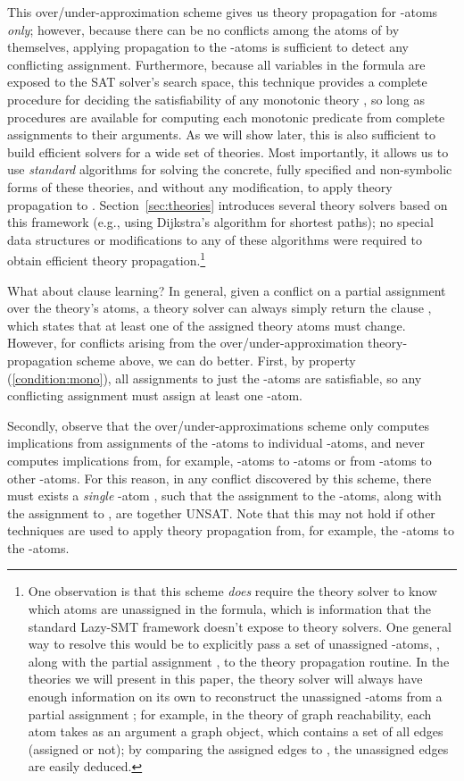 \documentclass[runningheads]{llncs}
\begin{document}
This over/under-approximation scheme gives us theory propagation for -atoms \textit{only};
however, because there can be no conflicts among the atoms of  by themselves, applying propagation to the -atoms is 
sufficient to detect any conflicting assignment. Furthermore, because all variables in the formula are exposed to the SAT solver's search space,
this technique provides a complete procedure for deciding the satisfiability of any monotonic theory ,
so long as procedures are available for computing each monotonic predicate from complete assignments to their arguments.
As we will show later,
this is also sufficient to build efficient solvers for a wide set of
theories. Most importantly, it allows us to use \textit{standard}
algorithms for solving the concrete, fully specified and non-symbolic
forms of these theories, and without any modification, to apply theory propagation to .
Section~\ref{sec:theories}
introduces several theory solvers based on this framework
(e.g., using Dijkstra's algorithm for shortest paths);
no special data structures or modifications to any of these
algorithms were required to obtain efficient theory propagation.\footnote{One observation is that this scheme \textit{does} require the theory solver
to know which atoms are unassigned in the formula, which is information that the
standard Lazy-SMT framework doesn't expose to theory solvers. 
One general way to resolve this would be to explicitly pass a set of unassigned
-atoms, , along with the partial assignment , to the theory
propagation routine. In the theories we will present in this
paper, the theory solver will always have enough information on its own to reconstruct
the unassigned -atoms from a partial assignment ; for example, in the 
theory of graph reachability, each  atom takes as an argument a 
graph object, which contains a set  of all edges (assigned or not); 
by comparing the assigned edges to , the unassigned edges are easily deduced.}

What about clause learning? In general, given a conflict on
a partial assignment  over the theory's atoms, a theory solver
can always simply return the clause , which states that at
least one of the assigned theory atoms must change. However,
for conflicts arising from the over/under-approximation
theory-propagation scheme above, we can do better. First, by property (\ref{condition:mono}),
all assignments to just the -atoms are satisfiable, so any conflicting
assignment must assign at least one -atom.

Secondly, observe that the over/under-approximations scheme only computes implications
from assignments of the -atoms  to individual -atoms, and never computes
implications from, for example, -atoms to -atoms or from -atoms to other -atoms.
For this reason, in any conflict discovered by this scheme, there must exists a \textit{single}
-atom , such that the assignment to the -atoms, along with the assignment to , are together UNSAT.
Note that this may not hold if other techniques are used to apply theory propagation from, for
example, the -atoms to the -atoms.
\end{document}
